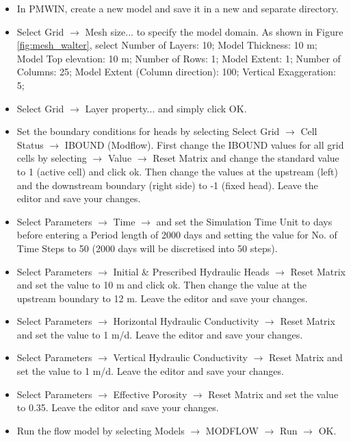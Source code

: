 \begin{itemize}

\item In PMWIN, create a new model and save it in a new and separate directory.

\item Select Grid $\rightarrow$ Mesh size... to specify the model domain. As shown in Figure \ref{fig:mesh_walter}, select Number of Layers: 10; Model Thickness: 10 m; Model Top elevation: 10 m; Number of Rows: 1; Model Extent: 1; Number of Columns: 25; Model Extent (Column direction): 100; Vertical Exaggeration: 5;

\item Select Grid $\rightarrow$ Layer property... and simply click OK. 

\item Set the boundary conditions for heads by selecting Select Grid $\rightarrow$ Cell Status $\rightarrow$ IBOUND (Modflow). First change the IBOUND values for all grid cells by selecting $\rightarrow$ Value $\rightarrow$ Reset Matrix and change the standard value to 1 (active cell) and click ok. Then change the values at the upstream (left) and the downstream boundary (right side) to -1 (fixed head). Leave the editor and save your changes.

\item Select Parameters $\rightarrow$ Time $\rightarrow$ and set the Simulation Time Unit to days before entering a Period length of 2000 days and setting the value for No. of Time Steps to 50 (2000 days will be discretised into 50 steps). 

\item Select Parameters $\rightarrow$ Initial \& Prescribed Hydraulic Heads $\rightarrow$ Reset Matrix and set the value to 10 m and click ok. Then change the value at the upstream boundary to 12 m. Leave the editor and save your changes.

\item Select Parameters $\rightarrow$ Horizontal Hydraulic Conductivity $\rightarrow$ Reset Matrix and set the value to 1 m/d. Leave the editor and save your changes.

\item Select Parameters $\rightarrow$ Vertical Hydraulic Conductivity $\rightarrow$ Reset Matrix and set the value to 1 m/d. Leave the editor and save your changes.

\item Select Parameters $\rightarrow$ Effective Porosity $\rightarrow$ Reset Matrix and set the value to 0.35. Leave the editor and save your changes.


\item Run the flow model by selecting Models $\rightarrow$ MODFLOW $\rightarrow$ Run $\rightarrow$ OK.


\end{itemize}

